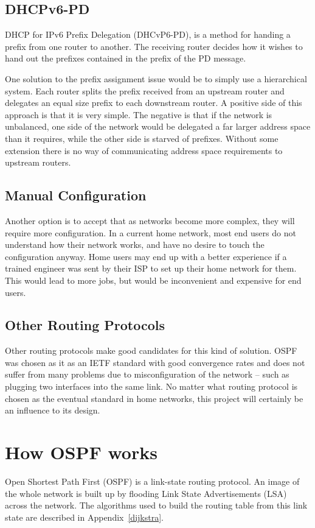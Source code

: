 \documentclass[12pt]{report}
\begin{document}
\subsection{DHCPv6-PD}
DHCP for IPv6 Prefix Delegation (DHCvP6-PD), is a method for handing a prefix from one router to
another. The receiving router decides how it wishes to hand out the prefixes
contained in the prefix of the PD message. 

One solution to the prefix assignment issue would be to simply use a
hierarchical system. Each router splits the prefix received from an upstream
router and delegates an equal size prefix to each downstream router. A positive
side of this approach is that it is very simple. The negative is that if the
network is unbalanced, one side of the network would be delegated a far larger
address space than it requires, while the other side is starved of prefixes.
Without some extension there is no way of communicating address space
requirements to upstream routers.   

\subsection{Manual Configuration}
Another option is to accept that as networks become more complex, they will
require more configuration. In a current home network, most end users do not
understand how their network works, and have no desire to touch the
configuration anyway. Home users may end up with a better experience if a
trained engineer was sent by their ISP to set up their home network for them.
This would lead to more jobs, but would be inconvenient and expensive for end
users.

\subsection{Other Routing Protocols}
Other routing protocols make good candidates for this kind of solution. OSPF
was chosen as it as an IETF standard with good convergence rates and does not
suffer from many problems due to misconfiguration of the network -- such as
plugging two interfaces into the same link. No matter what routing protocol is
chosen as the eventual standard in home networks, this project will certainly
be an influence to its design.

\section{How OSPF works}
Open Shortest Path First (OSPF) is a link-state routing
protocol. An image of the whole network is built up by flooding Link State
Advertisements (LSA) across the network. The algorithms used to build the
routing table from this link state are described in Appendix~\ref{dijkstra}.
\end{document}
